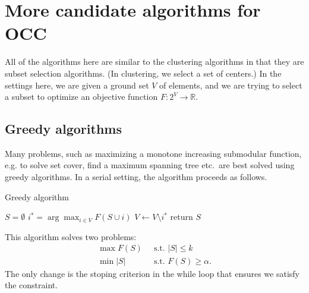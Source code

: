 \documentclass{article}
\newcommand{\union}{\cup}
\begin{document}
\section{More candidate algorithms for OCC}
All of the algorithms here are similar to the clustering algorithms in that they are subset selection algorithms. (In clustering, we select a set of centers.) In the settings here, we are given a ground set $V$ of elements, and we are trying to select a subset to optimize an objective function $F: 2^V \to \mathbb{R}$.

\subsection{Greedy algorithms}
Many problems, such as maximizing a monotone increasing submodular function, e.g. to solve set cover, find a maximum spanning tree etc.\ are best solved using greedy algorithms.
In a serial setting, the algorithm proceeds as follows.
  \begin{algorithm}
    \DontPrintSemicolon
    \caption{Greedy algorithm}
    \label{alg:greedy}
     $S =
    \emptyset$\; 
    { $i^* =
      \arg\max_{i \in V} F(S \union i)$\; 
      \If{$S \union i^*$ is within budget}{
        $S \leftarrow S \union i^*$\;}
      $V \leftarrow V \setminus i^*$\; } 
    return $S$\;
  \end{algorithm}
  


This algorithm solves two problems:
\begin{align}
  \max F(S) & \;\;\text{s.t. } |S| \leq k\\
  \min |S| & \;\;\text{s.t. } F(S) \geq \alpha.
\end{align}
The only change is the stoping criterion in the while loop that ensures we satisfy the constraint.
\end{document}
